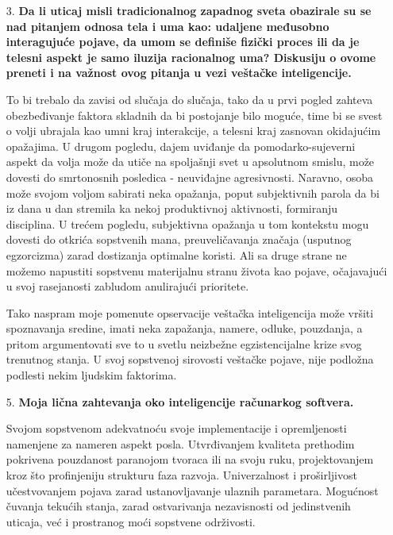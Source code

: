 \documentclass[fontsize=11bp, paper=a4]{scrartcl}
\begin{document}
\begin{enumerate}
    \item [3.]{\textbf{Da li uticaj misli tradicionalnog zapadnog sveta obazirale su se nad pitanjem odnosa tela i uma kao: 
    udaljene međusobno interagujuće pojave, 
    da umom se definiše fizički proces 
    ili da je telesni aspekt je samo iluzija racionalnog uma? 
    Diskusiju o ovome preneti i na važnost ovog pitanja u vezi veštačke inteligencije.}}
    
    To bi trebalo da zavisi od slučaja do slučaja, tako da u prvi pogled zahteva obezbeđivanje faktora skladnih da bi postojanje bilo moguće, time bi se svest o volji ubrajala kao umni kraj interakcije, a telesni kraj zasnovan okidajućim opažajima.
    U drugom pogledu, dajem uviđanje da pomodarko-sujeverni aspekt da volja može da utiče na spoljašnji svet u apsolutnom smislu, može dovesti do smrtonosnih posledica - neuviđajne agresivnosti. Naravno, osoba može svojom voljom sabirati neka opažanja, poput subjektivnih parola da bi iz dana u dan stremila ka nekoj produktivnoj aktivnosti, formiranju disciplina.
    U trećem pogledu, subjektivna opažanja u tom kontekstu mogu dovesti do otkrića sopstvenih mana, preuveličavanja značaja (usputnog egzorcizma) zarad dostizanja optimalne koristi. Ali sa druge strane ne možemo napustiti sopstvenu materijalnu stranu života kao pojave, očajavajući u svoj rasejanosti zabludom anulirajući prioritete.
    
    Tako naspram moje pomenute opservacije veštačka inteligencija može vršiti spoznavanja sredine, imati neka zapažanja, namere, odluke, pouzdanja, a pritom argumentovati sve to u svetlu neizbežne egzistencijalne krize svog trenutnog stanja. U svoj sopstvenoj sirovosti veštačke pojave, nije podložna podlesti nekim ljudskim faktorima.

    \item[5.] {\textbf{Moja lična zahtevanja oko inteligencije računarkog softvera.}}
    
    Svojom sopstvenom adekvatnoću svoje implementacije i opremljenosti namenjene za nameren aspekt posla. Utvrđivanjem kvaliteta prethodim pokrivena pouzdanost paranojom tvoraca ili na svoju ruku, projektovanjem kroz što profinjeniju strukturu faza razvoja. Univerzalnost i proširljivost učestvovanjem pojava zarad ustanovljavanje ulaznih parametara. Mogućnost čuvanja tekućih stanja, zarad ostvarivanja nezavisnosti od jedinstvenih uticaja, već i prostranog moći sopstvene održivosti.



\end{enumerate}
\newpage
\end{document}

